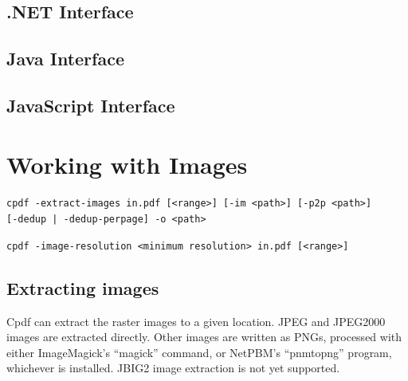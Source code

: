 \documentclass{book}
\begin{document}
\begin{dotnetcpdflib}
\clearpage
\section*{.NET Interface}
\begin{small}\tt

\end{small}
\end{dotnetcpdflib}

\begin{jcpdflib}
\clearpage
\section*{Java Interface}
\begin{small}\tt

\end{small}
\end{jcpdflib}

\begin{jscpdflib}
\clearpage
\section*{JavaScript Interface}
\begin{small}\tt

\end{small}
\end{jscpdflib}

\chapter{Working with Images}\label{chap:13}
\begin{framed}
\noindent\small\verb!cpdf -extract-images in.pdf [<range>] [-im <path>] [-p2p <path>]!
\noindent\small\verb!     [-dedup | -dedup-perpage] -o <path>!

\vspace{1.5mm}
\noindent\small\verb!cpdf -image-resolution <minimum resolution> in.pdf [<range>]!
\end{framed}

\section{Extracting images}

Cpdf can extract the raster images to a given location. JPEG and JPEG2000 images are extracted directly. Other images are written as PNGs, processed with either ImageMagick's ``magick'' command, or NetPBM's ``pnmtopng'' program, whichever is installed. JBIG2 image extraction is not yet supported.
\end{document}
